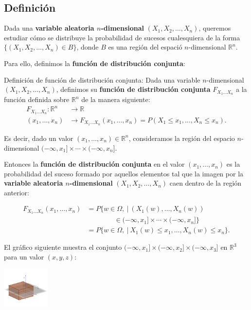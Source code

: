 \documentclass[
  letterpaper,
  DIV=11,
  numbers=noendperiod]{scrreprt}
\begin{document}
\hypertarget{definiciuxf3n-4}{%
\subsection{Definición}\label{definiciuxf3n-4}}

Dada una \textbf{variable aleatoria \(n\)-dimensional}
\((X_1,X_2,\ldots,X_n)\), queremos estudiar cómo se distribuye la
probabilidad de sucesos cualesquiera de la forma
\(\{(X_1,X_2,\ldots,X_n)\in B\}\), donde \(B\) es una región del espació
\(n\)-dimensional \(\mathbb{R}^n\).

Para ello, definimos la \textbf{función de distribución conjunta}:

Definición de función de distribución conjunta: Dada una variable
\(n\)-dimensional \((X_1,X_2,\ldots,X_n)\), definimos su \textbf{función
de distribución conjunta} \(F_{X_1\ldots X_n}\) a la función definida
sobre \(\mathbb{R}^n\) de la manera siguiente: \[
\begin{array}{rl}
F_{X_1\ldots X_n}: \mathbb{R}^n & \longrightarrow \mathbb{R}\\
(x_1,\ldots,x_n) & \longrightarrow F_{X_1\ldots X_n}(x_1,\ldots,x_n)=P(X_1\leq x_1,\ldots,X_n\leq x_n).
\end{array}
\]

Es decir, dado un valor \((x_1,\ldots,x_n)\in \mathbb{R}^n\),
consideramos la región del espacio \(n\)-dimensional
\((-\infty,x_1]\times\cdots\times (-\infty,x_n]\).

Entonces la \textbf{función de distribución conjunta} en el valor
\((x_1,\ldots,x_n)\) es la probabilidad del suceso formado por aquellos
elementos tal que la imagen por la \textbf{variable aleatoria
\(n\)-dimensional} \((X_1,X_2,\ldots,X_n)\) caen dentro de la región
anterior:

\[
\begin{array}{rl}
F_{X_1\ldots X_n}(x_1,\ldots,x_n) & =P\{w\in\Omega,\ |\ (X_1(w),\ldots,X_n(w)) \\ & \qquad\qquad\in (-\infty,x_1]\times\cdots\times (-\infty,x_n]\} \\ & = P\{w\in\Omega,\ |\ X_1(w)\leq x_1,\ldots, X_n(w)\leq x_n\}.
\end{array}
\]

El gráfico siguiente muestra el conjunto
\((-\infty,x_1]\times (-\infty,x_2]\times (-\infty,x_3]\) en
\(\mathbb{R}^3\) para un valor \((x,y,z)\):

\includegraphics[width=0.94in,height=\textheight]{Images/Fx1x2x3.png}
\end{document}
